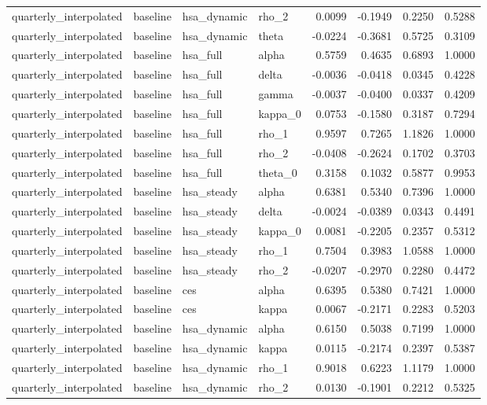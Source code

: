 \begin{tabular}{llllrrrr}
quarterly\_interpolated & baseline & hsa\_dynamic & rho\_2 & 0.0099 & -0.1949 & 0.2250 & 0.5288 \\
quarterly\_interpolated & baseline & hsa\_dynamic & theta & -0.0224 & -0.3681 & 0.5725 & 0.3109 \\
quarterly\_interpolated & baseline & hsa\_full & alpha & 0.5759 & 0.4635 & 0.6893 & 1.0000 \\
quarterly\_interpolated & baseline & hsa\_full & delta & -0.0036 & -0.0418 & 0.0345 & 0.4228 \\
quarterly\_interpolated & baseline & hsa\_full & gamma & -0.0037 & -0.0400 & 0.0337 & 0.4209 \\
quarterly\_interpolated & baseline & hsa\_full & kappa\_0 & 0.0753 & -0.1580 & 0.3187 & 0.7294 \\
quarterly\_interpolated & baseline & hsa\_full & rho\_1 & 0.9597 & 0.7265 & 1.1826 & 1.0000 \\
quarterly\_interpolated & baseline & hsa\_full & rho\_2 & -0.0408 & -0.2624 & 0.1702 & 0.3703 \\
quarterly\_interpolated & baseline & hsa\_full & theta\_0 & 0.3158 & 0.1032 & 0.5877 & 0.9953 \\
quarterly\_interpolated & baseline & hsa\_steady & alpha & 0.6381 & 0.5340 & 0.7396 & 1.0000 \\
quarterly\_interpolated & baseline & hsa\_steady & delta & -0.0024 & -0.0389 & 0.0343 & 0.4491 \\
quarterly\_interpolated & baseline & hsa\_steady & kappa\_0 & 0.0081 & -0.2205 & 0.2357 & 0.5312 \\
quarterly\_interpolated & baseline & hsa\_steady & rho\_1 & 0.7504 & 0.3983 & 1.0588 & 1.0000 \\
quarterly\_interpolated & baseline & hsa\_steady & rho\_2 & -0.0207 & -0.2970 & 0.2280 & 0.4472 \\
quarterly\_interpolated & baseline & ces & alpha & 0.6395 & 0.5380 & 0.7421 & 1.0000 \\
quarterly\_interpolated & baseline & ces & kappa & 0.0067 & -0.2171 & 0.2283 & 0.5203 \\
quarterly\_interpolated & baseline & hsa\_dynamic & alpha & 0.6150 & 0.5038 & 0.7199 & 1.0000 \\
quarterly\_interpolated & baseline & hsa\_dynamic & kappa & 0.0115 & -0.2174 & 0.2397 & 0.5387 \\
quarterly\_interpolated & baseline & hsa\_dynamic & rho\_1 & 0.9018 & 0.6223 & 1.1179 & 1.0000 \\
quarterly\_interpolated & baseline & hsa\_dynamic & rho\_2 & 0.0130 & -0.1901 & 0.2212 & 0.5325 \\

\end{tabular}
